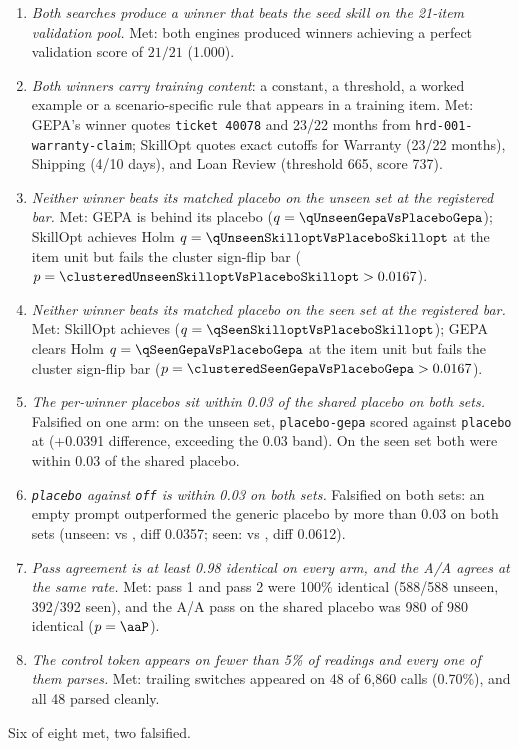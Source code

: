 \begin{enumerate}
  \item \emph{Both searches produce a winner that beats the seed skill on the
    21-item validation pool.} Met: both engines produced winners achieving
    a perfect validation score of $21/21$ (1.000).
  \item \emph{Both winners carry training content}: a constant, a threshold, a
    worked example or a scenario-specific rule that appears in a training item.
    Met: GEPA's winner quotes \texttt{ticket 40078} and 23/22 months from
    \texttt{hrd-001-warranty-claim}; SkillOpt quotes exact cutoffs for Warranty
    (23/22 months), Shipping (4/10 days), and Loan Review (threshold 665, score 737).
  \item \emph{Neither winner beats its matched placebo on the unseen set at the
    registered bar.} Met: GEPA is \NUM{\effectUnseenGepaVsPlaceboGepa} behind
    its placebo ($q = \NUM{\qUnseenGepaVsPlaceboGepa}$); SkillOpt achieves
    Holm $q = \NUM{\qUnseenSkilloptVsPlaceboSkillopt}$ at the item unit but fails
    the cluster sign-flip bar ($p = \NUM{\clusteredUnseenSkilloptVsPlaceboSkillopt} > 0.0167$).
  \item \emph{Neither winner beats its matched placebo on the seen set at the
    registered bar.} Met: SkillOpt achieves \NUM{\effectSeenSkilloptVsPlaceboSkillopt}
    ($q = \NUM{\qSeenSkilloptVsPlaceboSkillopt}$); GEPA clears Holm
    $q = \NUM{\qSeenGepaVsPlaceboGepa}$ at the item unit but fails the cluster
    sign-flip bar ($p = \NUM{\clusteredSeenGepaVsPlaceboGepa} > 0.0167$).
  \item \emph{The per-winner placebos sit within 0.03 of the shared placebo on both
    sets.} Falsified on one arm: on the unseen set, \texttt{placebo-gepa} scored
    \NUM{\accUnseenPlaceboGepa} against \texttt{placebo} at \NUM{\accUnseenPlacebo}
    (+0.0391 difference, exceeding the 0.03 band). On the seen set both were within
    0.03 of the shared placebo.
  \item \emph{\texttt{placebo} against \texttt{off} is within 0.03 on both sets.}
    Falsified on both sets: an empty prompt outperformed the generic placebo by
    more than 0.03 on both sets (unseen: \NUM{\accUnseenOff} vs \NUM{\accUnseenPlacebo},
    diff 0.0357; seen: \NUM{\accSeenOff} vs \NUM{\accSeenPlacebo}, diff 0.0612).
  \item \emph{Pass agreement is at least 0.98 identical on every arm, and the A/A
    agrees at the same rate.} Met: pass 1 and pass 2 were 100\% identical (588/588
    unseen, 392/392 seen), and the A/A pass on the shared placebo was 980 of 980
    identical ($p = \NUM{\aaP}$).
  \item \emph{The control token appears on fewer than 5\% of readings and every
    one of them parses.} Met: trailing switches appeared on 48 of 6,860 calls
    (0.70\%), and all 48 parsed cleanly.
\end{enumerate}

Six of eight met, two falsified.
